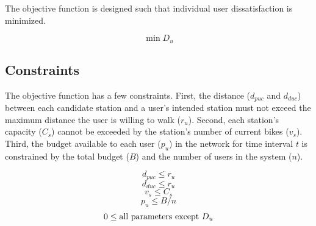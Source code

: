 \documentclass[times, 10pt,twocolumn]{article}
\begin{document}
The objective function is designed such that individual user dissatisfaction is minimized.

\begin{equation}
\min{D_u}
\end{equation}

\subsection{Constraints}

The objective function has a few constraints. First, the distance ($d_{puc}$ and $d_{duc}$) between each candidate station and a user's intended station must not exceed the maximum distance the user is willing to walk ($r_u$). Second, each station's capacity ($C_s$) cannot be exceeded by the station's number of current bikes ($v_s$). Third, the budget available to each user ($p_u$) in the network for time interval $t$ is constrained by the total budget ($B$) and the number of users in the system ($n$).

\begin{equation}
d_{puc} \leq r_u
\end{equation}
\begin{equation}
d_{duc} \leq r_u
\end{equation}
\begin{equation}
v_s \leq C_s
\end{equation}
\begin{equation}
p_u \leq B/n
\end{equation}
\begin{equation}
0 \leq \textnormal{all parameters except } D_u
\end{equation}
\end{document}

